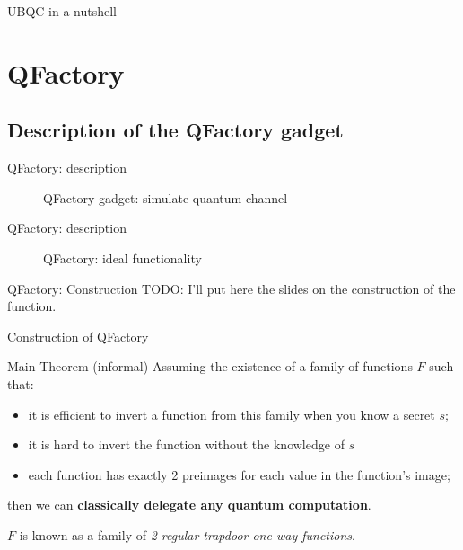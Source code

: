 \documentclass[]{beamer}
\begin{document}
\begin{frame}{UBQC in a nutshell}
  \begin{figure}[ht]
    \centering
  \end{figure}
\end{frame}

\section{QFactory}

\subsection{Description of the QFactory gadget}

\begin{frame}{QFactory: description}
  \begin{figure}[ht]
    \centering
    \caption{QFactory gadget: simulate quantum channel}
  \end{figure}
\end{frame}


\begin{frame}{QFactory: description}
  \begin{figure}[ht]
    \centering
    \caption{QFactory: ideal functionality}
  \end{figure}
\end{frame}

\begin{frame}{QFactory: Construction}
  TODO: I'll put here the slides on the construction of the function.
\end{frame}

\begin{frame}{Construction of QFactory}
  \begin{block}{Main Theorem (informal)}
    Assuming the existence of a family of functions $F$ such that:
    \begin{itemize}
    \item it is efficient to invert a function from this family when you know a secret $s$;
    \item it is hard to invert the function without the knowledge of $s$
    \item each function has exactly 2 preimages for each value in the function's image;
    \end{itemize}
    then we can \textbf{classically delegate any quantum computation}.
  
    $F$ is known as a family of \textit{2-regular trapdoor one-way functions}. \\
    
  \end{block}
\end{frame}
\end{document}
